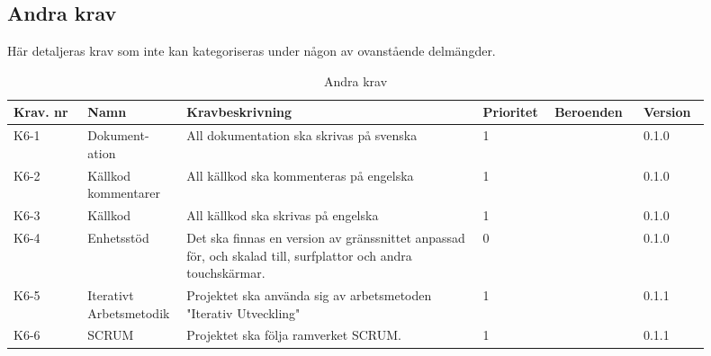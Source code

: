 \documentclass{article}
\begin{document}
\subsection{Andra krav}
Här detaljeras krav som inte kan kategoriseras under någon av ovanstående delmängder. 

\begin{table}[H]

    \caption{Andra krav}
    \label{tab:placeholder_label}
    \centering
    \begin{tabular}{|p{0.1\linewidth}|p{0.1\linewidth}|p{0.4\linewidth}|p{0.09\linewidth}|p{0.12\linewidth}|p{0.09\linewidth}|}
        \hline
        \textbf{Krav. nr} & \textbf{Namn} & \textbf{Kravbeskrivning} & \textbf{Prioritet} & \textbf{Beroenden}  & \textbf{Version} \\ \hline
        K6-1 & Dokument-ation & All dokumentation ska skrivas på svenska & 1 & & 0.1.0\\ \hline
        K6-2 & Källkod kommentarer & All källkod ska kommenteras på engelska & 1 & & 0.1.0\\ \hline
        K6-3 & Källkod & All källkod ska skrivas på engelska & 1 & & 0.1.0\\ \hline
        K6-4 & Enhetsstöd & Det ska finnas en version av gränssnittet anpassad för, och skalad till, surfplattor och andra touchskärmar. & 0 & & 0.1.0\\ \hline
        K6-5 & Iterativt Arbetsmetodik & Projektet ska använda sig av arbetsmetoden "Iterativ Utveckling" & 1 &  & 0.1.1\\ \hline
        K6-6 & SCRUM & Projektet ska följa ramverket SCRUM. & 1 &  & 0.1.1\\ \hline
    \end{tabular}
\end{table}
\end{document}
